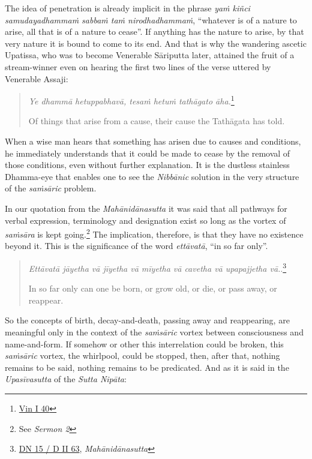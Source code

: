The idea of penetration is already implicit in the phrase \emph{yaṁ kiñci samudayadhammaṁ sabbaṁ taṁ nirodhadhammaṁ}, ``whatever is of a nature to arise, all that is of a nature to cease''. If anything has the nature to arise, by that very nature it is bound to come to its end. And that is why the wandering ascetic Upatissa, who was to become Venerable Sāriputta later, attained the fruit of a stream-winner even on hearing the first two lines of the verse uttered by Venerable Assaji:

\begin{quote}
\emph{Ye dhammā hetuppabhavā, tesaṁ hetuṁ tathāgato āha.}\footnote{\href{https://suttacentral.net/pli-tv-kd1/pli/ms}{Vin I 40}}

Of things that arise from a cause, their cause the Tathāgata has told.
\end{quote}

When a wise man hears that something has arisen due to causes and conditions, he immediately understands that it could be made to cease by the removal of those conditions, even without further explanation. It is the dustless stainless Dhamma-eye that enables one to see the \emph{Nibbānic} solution in the very structure of the \emph{saṁsāric} problem.

In our quotation from the \emph{Mahānidānasutta} it was said that all pathways for verbal expression, terminology and designation exist so long as the vortex of \emph{saṁsāra} is kept going.\footnote{See \emph{Sermon 2}} The implication, therefore, is that they have no existence beyond it. This is the significance of the word \emph{ettāvatā}, ``in so far only''.

\begin{quote}
\emph{Ettāvatā jāyetha vā jīyetha vā mīyetha vā cavetha vā upapajjetha vā.}.\footnote{\href{https://suttacentral.net/dn15/pli/ms}{DN 15 / D II 63}, \emph{Mahānidānasutta}}

In so far only can one be born, or grow old, or die, or pass away, or reappear.
\end{quote}

So the concepts of birth, decay-and-death, passing away and reappearing, are meaningful only in the context of the \emph{saṁsāric} vortex between consciousness and name-and-form. If somehow or other this interrelation could be broken, this \emph{saṁsāric} vortex, the whirlpool, could be stopped, then, after that, nothing remains to be said, nothing remains to be predicated. And as it is said in the \emph{Upasīvasutta} of the \emph{Sutta Nipāta}:


